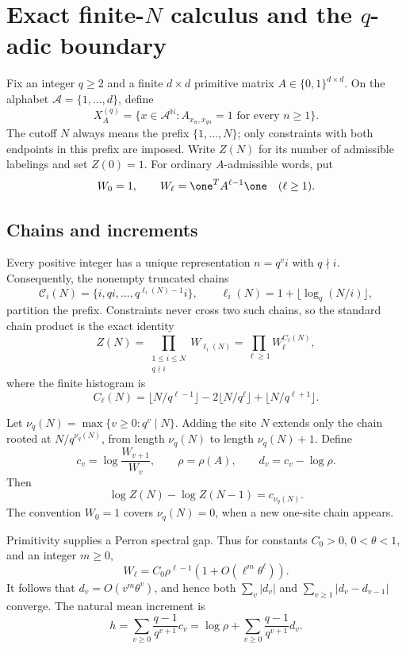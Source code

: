 \section{Exact finite-\texorpdfstring{\(N\)}{N} calculus and the
\texorpdfstring{\(q\)}{q}-adic boundary}
\label{sec:exact}

Fix an integer \(q\ge2\) and a finite \(d\times d\) primitive matrix
\(A\in\{0,1\}^{d\times d}\).  On the alphabet
\(\mathcal A=\{1,\ldots,d\}\), define
\[
  X_A^{(q)}
  =\{x\in\mathcal A^{\mathbb N}: A_{x_n,x_{qn}}=1
    \text{ for every }n\ge1\}.
\]
The cutoff \(N\) always means the prefix \(\{1,\ldots,N\}\); only
constraints with both endpoints in this prefix are imposed.  Write \(Z(N)\)
for its number of admissible labelings and set \(Z(0)=1\).  For ordinary
\(A\)-admissible words, put
\[
  W_0=1,\qquad
  W_\ell=\one^{T}A^{\ell-1}\one\quad(\ell\ge1).
\]

\subsection{Chains and increments}

Every positive integer has a unique representation \(n=q^vi\) with
\(q\nmid i\).  Consequently, the nonempty truncated chains
\[
  \mathcal C_i(N)=\{i,qi,\ldots,q^{\ell_i(N)-1}i\},
  \qquad
  \ell_i(N)=1+\lfloor\log_q(N/i)\rfloor ,
\]
partition the prefix.  Constraints never cross two such chains, so the
standard chain product is the exact identity
\begin{equation}
  Z(N)=\prod_{\substack{1\le i\le N\\q\nmid i}}W_{\ell_i(N)}
      =\prod_{\ell\ge1}W_\ell^{C_\ell(N)},
  \label{eq:chain-product}
\end{equation}
where the finite histogram is
\[
  C_\ell(N)=
  \lfloor N/q^{\ell-1}\rfloor
  -2\lfloor N/q^\ell\rfloor
  +\lfloor N/q^{\ell+1}\rfloor .
\]

Let \(\nu_q(N)=\max\{v\ge0:q^v\mid N\}\).  Adding the site \(N\) extends
only the chain rooted at \(N/q^{\nu_q(N)}\), from length \(\nu_q(N)\) to
length \(\nu_q(N)+1\).  Define
\[
  c_v=\log\frac{W_{v+1}}{W_v},\qquad
  \rho=\rho(A),\qquad d_v=c_v-\log\rho .
\]
Then
\begin{equation}
  \log Z(N)-\log Z(N-1)=c_{\nu_q(N)}.
  \label{eq:increment}
\end{equation}
The convention \(W_0=1\) covers \(\nu_q(N)=0\), when a new one-site chain
appears.

Primitivity supplies a Perron spectral gap.  Thus for constants
\(C_0>0\), \(0<\theta<1\), and an integer \(m\ge0\),
\[
  W_\ell=C_0\rho^{\ell-1}
  (1+O(\ell^m\theta^\ell)).
\]
It follows that \(d_v=O(v^m\theta^v)\), and hence both
\(\sum_v|d_v|\) and \(\sum_{v\ge1}|d_v-d_{v-1}|\) converge.
The natural mean increment is
\begin{equation}
  h=\sum_{v\ge0}\frac{q-1}{q^{v+1}}c_v
   =\log\rho+\sum_{v\ge0}\frac{q-1}{q^{v+1}}d_v .
  \label{eq:entropy}
\end{equation}


